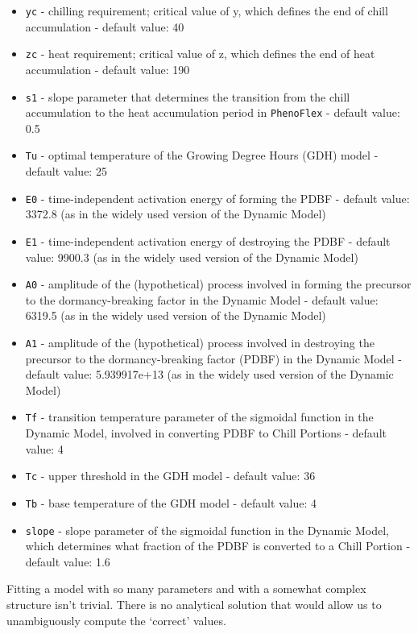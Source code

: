 \documentclass[
]{book}
\providecommand{\tightlist}{%
  \setlength{\itemsep}{0pt}\setlength{\parskip}{0pt}}
\begin{document}
\begin{itemize}
\tightlist
\item
  \texttt{yc} - chilling requirement; critical value of y, which defines the end of chill accumulation - default value: 40
\item
  \texttt{zc} - heat requirement; critical value of z, which defines the end of heat accumulation - default value: 190
\item
  \texttt{s1} - slope parameter that determines the transition from the chill accumulation to the heat accumulation period in \texttt{PhenoFlex} - default value: 0.5
\item
  \texttt{Tu} - optimal temperature of the Growing Degree Hours (GDH) model - default value: 25
\item
  \texttt{E0} - time-independent activation energy of forming the PDBF - default value: 3372.8 (as in the widely used version of the Dynamic Model)
\item
  \texttt{E1} - time-independent activation energy of destroying the PDBF - default value: 9900.3 (as in the widely used version of the Dynamic Model)
\item
  \texttt{A0} - amplitude of the (hypothetical) process involved in forming the precursor to the dormancy-breaking factor in the Dynamic Model - default value: 6319.5 (as in the widely used version of the Dynamic Model)
\item
  \texttt{A1} - amplitude of the (hypothetical) process involved in destroying the precursor to the dormancy-breaking factor (PDBF) in the Dynamic Model - default value: 5.939917e+13 (as in the widely used version of the Dynamic Model)
\item
  \texttt{Tf} - transition temperature parameter of the sigmoidal function in the Dynamic Model, involved in converting PDBF to Chill Portions - default value: 4
\item
  \texttt{Tc} - upper threshold in the GDH model - default value: 36
\item
  \texttt{Tb} - base temperature of the GDH model - default value: 4
\item
  \texttt{slope} - slope parameter of the sigmoidal function in the Dynamic Model, which determines what fraction of the PDBF is converted to a Chill Portion - default value: 1.6
\end{itemize}

Fitting a model with so many parameters and with a somewhat complex structure isn't trivial. There is no analytical solution that would allow us to unambiguously compute the `correct' values.
\end{document}
